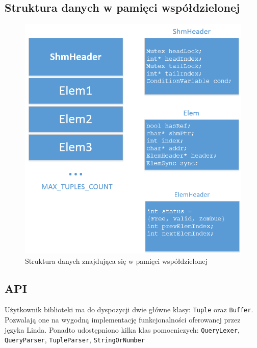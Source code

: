 \documentclass[a4paper]{article}
\begin{document}
	\subsection{Struktura danych w pamięci współdzielonej}
	\begin{figure}[H]
	\centering
	\includegraphics[width=130mm]{images/struct.png}
	\caption{Struktura danych znajdująca się w pamięci współdzielonej}
	\end{figure}


	\subsection{API}
	Użytkownik biblioteki ma do dyspozycji dwie główne klasy: \texttt{Tuple} oraz \texttt{Buffer}. Pozwalają one na wygodną implementację funkcjonalności oferowanej przez języka Linda. Ponadto udostępniono kilka klas pomocniczych: \texttt{QueryLexer}, \texttt{QueryParser}, \texttt{TupleParser}, \texttt{StringOrNumber}
\end{document}
